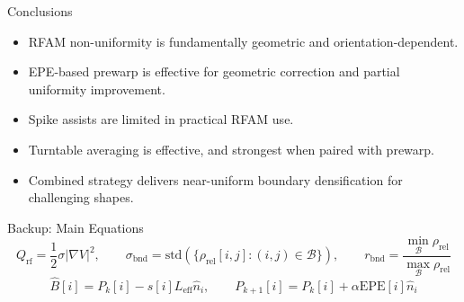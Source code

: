 \documentclass[aspectratio=169,10pt]{beamer}
\newcommand{\Qrf}{Q_{\mathrm{rf}}}
\newcommand{\bndstd}{\sigma_{\mathrm{bnd}}}
\newcommand{\Leff}{L_{\mathrm{eff}}}
\newcommand{\rhorel}{\rho_{\mathrm{rel}}}
\newcommand{\EPE}{\mathrm{EPE}}
\begin{document}
\begin{frame}{Conclusions}
  \begin{itemize}
    \item RFAM non-uniformity is fundamentally geometric and orientation-dependent.
    \item EPE-based prewarp is effective for geometric correction and partial uniformity improvement.
    \item Spike assists are limited in practical RFAM use.
    \item Turntable averaging is effective, and strongest when paired with prewarp.
    \item Combined strategy delivers near-uniform boundary densification for challenging shapes.
  \end{itemize}
\end{frame}

\begin{frame}{Backup: Main Equations}
  \small
  \[
    \Qrf = \frac{1}{2}\sigma |\nabla V|^2,\qquad
    \bndstd = \mathrm{std}\left(\{\rhorel[i,j]:(i,j)\in\mathcal{B}\}\right),\qquad
    r_{\mathrm{bnd}}=\frac{\min_{\mathcal{B}}\rhorel}{\max_{\mathcal{B}}\rhorel}
  \]
  \[
    \hat{B}[i]=P_k[i]-s[i]\Leff \hat{n}_i,\qquad
    P_{k+1}[i]=P_k[i]+\alpha \EPE[i]\hat{n}_i
  \]
\end{frame}
\end{document}
